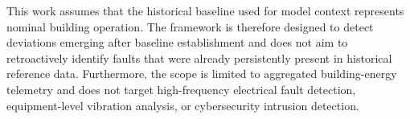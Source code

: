 This work assumes that the historical baseline used for model context represents
nominal building operation. The framework is therefore designed to detect deviations
emerging after baseline establishment and does not aim to retroactively identify
faults that were already persistently present in historical reference data. Furthermore,
the scope is limited to aggregated building-energy telemetry and does not target
high-frequency electrical fault detection, equipment-level vibration analysis, or
cybersecurity intrusion detection.
